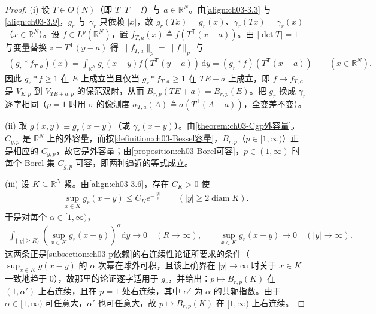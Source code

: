 \documentclass[../../main.tex]{subfiles}%
\begin{document}
\begin{proof}
(i) 设 $T\in O(N)$（即 $T^{\mathsf T}T=I$）与 $a\in\mathbb{R}^N$。由\eqref{align:ch03-3.3} 与\eqref{align:ch03-3.9}，$g_r$ 与 $\gamma_r$ 只依赖 $|x|$，故 $g_r(Tx)=g_r(x)$、$\gamma_r(Tx)=\gamma_r(x)$（$x\in\mathbb{R}^N$）。设 $f\in L^p(\mathbb{R}^N)$，置 $f_{T,a}(x)\triangleq f(T^{\mathsf T}(x-a))$。由 $|\det T|=1$ 与变量替换 $z=T^{\mathsf T}(y-a)$ 得 $\|f_{T,a}\|_p=\|f\|_p$ 与
\begin{align*}
(g_r*f_{T,a})(x)=\int_{\mathbb{R}^N}g_r(x-y)f(T^{\mathsf T}(y-a))\,\mathrm{d}y=(g_r*f)(T^{\mathsf T}(x-a))\qquad(x\in\mathbb{R}^N).
\end{align*}
因此 $g_r*f\geqslant1$ 在 $E$ 上成立当且仅当 $g_r*f_{T,a}\geqslant1$ 在 $TE+a$ 上成立，即 $f\mapsto f_{T,a}$ 是 $V_{E,p}$ 到 $V_{TE+a,p}$ 的保范双射，从而 $B_{r,p}(TE+a)=B_{r,p}(E)$。把 $g_r$ 换成 $\gamma_r$ 逐字相同（$p=1$ 时用 $\sigma$ 的像测度 $\sigma_{T,a}(A)\triangleq\sigma(T^{\mathsf T}(A-a))$，全变差不变）。

(ii) 取 $g(x,y)\equiv g_r(x-y)$（或 $\gamma_r(x-y)$）。由\cref{theorem:ch03-Cgp外容量}，$C_{g,p}$ 是 $\mathbb{R}^N$ 上的外容量，而按\cref{definition:ch03-Bessel容量}，$B_{r,p}$（$p\in[1,\infty)$）正是相应的 $C_{g,p}$，故它是外容量；由\cref{proposition:ch03-Borel可容}，$p\in(1,\infty)$ 时每个 Borel 集 $C_{g,p}$-可容，即两种逼近的等式成立。

(iii) 设 $K\subseteq\mathbb{R}^N$ 紧。由\eqref{align:ch03-3.6}，存在 $C_K>0$ 使
\begin{align*}
\sup_{x\in K}g_r(x-y)\leqslant C_Ke^{-\frac{|y|}{2}}\qquad(|y|\geqslant2\operatorname{diam}K).
\end{align*}
于是对每个 $\alpha\in[1,\infty)$，
\begin{align*}
\int_{\{|y|\geqslant R\}}\left(\sup_{x\in K}g_r(x-y)\right)^\alpha\mathrm{d}y\longrightarrow0\quad(R\to\infty),
\qquad
\sup_{x\in K}g_r(x-y)\longrightarrow0\quad(|y|\to\infty).
\end{align*}
这两条正是\cref{subsection:ch03-p依赖}的右连续性论证所要求的条件（$\sup_{x\in K}g(x-y)$ 的 $\alpha$ 次幂在球外可积，且该上确界在 $|y|\to\infty$ 时关于 $x\in K$ 一致地趋于 $0$），故那里的论证逐字适用于 $g_r$，并给出：$p\mapsto B_{r,p}(K)$ 在 $(1,\alpha')$ 上右连续，且在 $p=1$ 处右连续，其中 $\alpha'$ 为 $\alpha$ 的共轭指数。由于 $\alpha\in[1,\infty)$ 可任意大，$\alpha'$ 也可任意大，故 $p\mapsto B_{r,p}(K)$ 在 $[1,\infty)$ 上右连续。


\end{proof}
\end{document}
